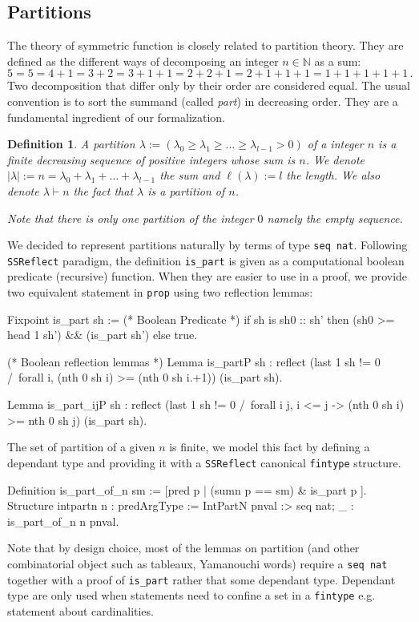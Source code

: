 \documentclass[12pt,a4paper]{article}
\newcommand{\SSR}{\texttt{SSReflect}\xspace}
\newcommand{\N}{{\mathbb N}}
\newcommand{\partof}{\vdash}                    %
\newtheorem{DEFN}{Definition}
\begin{document}
\subsection{Partitions}

The theory of symmetric function is closely related to partition theory. They
are defined as the different ways of decomposing an integer $n\in\N$ as a sum:
\[ 5=5=4+1=3+2=3+1+1=2+2+1=2+1+1+1=1+1+1+1+1\,. \] Two decomposition that differ
only by their order are considered equal. The usual convention is to sort the
summand (called \emph{part}) in decreasing order. They are a fundamental
ingredient of our formalization.

\begin{DEFN}
  A partition $\lambda := (\lambda_0\geq\lambda_1\geq\dots\geq\lambda_{l-1} >
  0)$ of a integer $n$ is a finite decreasing sequence of positive integers
  whose sum is $n$. We denote $|\lambda| := n =
  \lambda_0+\lambda_1+\dots+\lambda_{l-1}$ the sum and $\ell(\lambda) := l$
  the length. We also denote $\lambda\partof n$ the fact that $\lambda$ is a
  partition of $n$.

  Note that there is only one partition of the integer $0$ namely the empty
  sequence.
\end{DEFN}
We decided to represent partitions naturally by terms of type \verb+seq nat+.
Following \SSR paradigm, the definition \verb|is_part| is given as a
computational boolean predicate (recursive) function. When they are easier to
use in a proof, we provide two equivalent statement in \verb|prop| using two
reflection lemmas:
\begin{coqcode}
  Fixpoint is_part sh := (* Boolean Predicate *)
    if sh is sh0 :: sh'
    then (sh0 >= head 1 sh') && (is_part sh')
    else true.

  (* Boolean reflection lemmas *)
  Lemma is_partP sh : reflect
    (last 1 sh != 0 /\ forall i, (nth 0 sh i) >= (nth 0 sh i.+1))
    (is_part sh).

  Lemma is_part_ijP sh : reflect
    (last 1 sh != 0 /\ forall i j, i <= j -> (nth 0 sh i) >= nth 0 sh j) 
    (is_part sh).
\end{coqcode}
The set of partition of a given $n$ is finite, we model this fact by defining
a dependant type and providing it with a \SSR canonical \verb+fintype+
structure.
\begin{coqcode}
Definition is_part_of_n sm := [pred p | (sumn p == sm) & is_part p ].
Structure intpartn n : predArgType :=
  IntPartN {pnval :> seq nat; _ : is_part_of_n n pnval}.
\end{coqcode}
Note that by design choice, most of the lemmas on partition (and other
combinatorial object such as tableaux, Yamanouchi words) require a
\verb|seq nat| together with a proof of \verb+is_part+ rather that some
dependant type. Dependant type are only used when statements need to confine a
set in a \verb+fintype+ e.g. statement about cardinalities.
\end{document}
